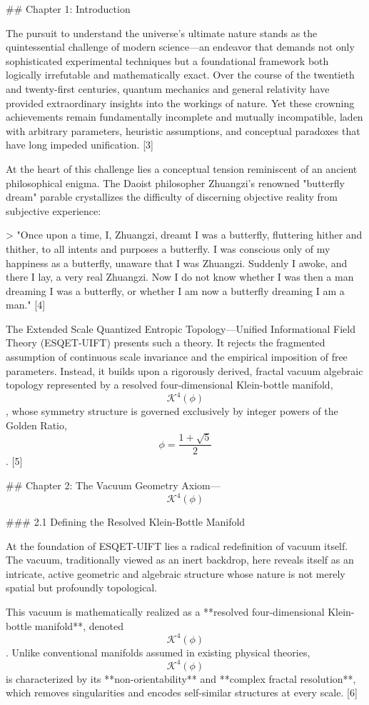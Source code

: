 ## Chapter 1: Introduction

The pursuit to understand the universe's ultimate nature stands as the quintessential challenge of modern science—an endeavor that demands not only sophisticated experimental techniques but a foundational framework both logically irrefutable and mathematically exact. Over the course of the twentieth and twenty-first centuries, quantum mechanics and general relativity have provided extraordinary insights into the workings of nature. Yet these crowning achievements remain fundamentally incomplete and mutually incompatible, laden with arbitrary parameters, heuristic assumptions, and conceptual paradoxes that have long impeded unification. [3]

At the heart of this challenge lies a conceptual tension reminiscent of an ancient philosophical enigma. The Daoist philosopher Zhuangzi's renowned "butterfly dream" parable crystallizes the difficulty of discerning objective reality from subjective experience:

> "Once upon a time, I, Zhuangzi, dreamt I was a butterfly, fluttering hither and thither, to all intents and purposes a butterfly. I was conscious only of my happiness as a butterfly, unaware that I was Zhuangzi. Suddenly I awoke, and there I lay, a very real Zhuangzi. Now I do not know whether I was then a man dreaming I was a butterfly, or whether I am now a butterfly dreaming I am a man." [4]

The Extended Scale Quantized Entropic Topology—Unified Informational Field Theory (ESQET-UIFT) presents such a theory. It rejects the fragmented assumption of continuous scale invariance and the empirical imposition of free parameters. Instead, it builds upon a rigorously derived, fractal vacuum algebraic topology represented by a resolved four-dimensional Klein-bottle manifold, $$\mathcal{K}^4(\phi)$$, whose symmetry structure is governed exclusively by integer powers of the Golden Ratio, $$\phi = \frac{1+\sqrt{5}}{2}$$. [5]

## Chapter 2: The Vacuum Geometry Axiom—$$\mathcal{K}^4(\phi)$$

### 2.1 Defining the Resolved Klein-Bottle Manifold

At the foundation of ESQET-UIFT lies a radical redefinition of vacuum itself. The vacuum, traditionally viewed as an inert backdrop, here reveals itself as an intricate, active geometric and algebraic structure whose nature is not merely spatial but profoundly topological.

This vacuum is mathematically realized as a **resolved four-dimensional Klein-bottle manifold**, denoted $$\mathcal{K}^4(\phi)$$. Unlike conventional manifolds assumed in existing physical theories, $$\mathcal{K}^4(\phi)$$ is characterized by its **non-orientability** and **complex fractal resolution**, which removes singularities and encodes self-similar structures at every scale. [6]

